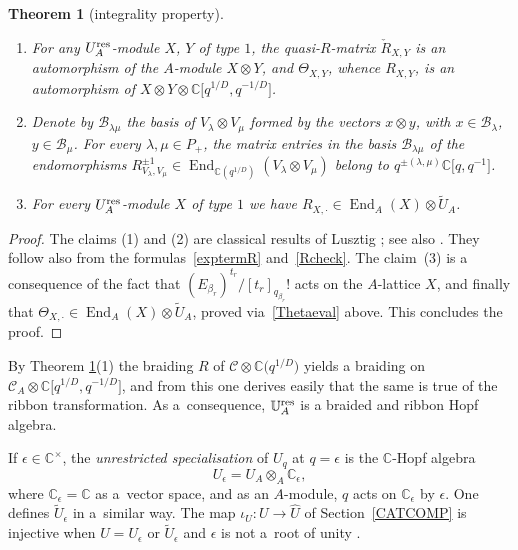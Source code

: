 \documentclass[pdftex]{sigma}%
\numberwithin{equation}{section}
\numberwithin{figure}{section}
\newtheorem{teo}{Theorem}[section]
\newcommand{\e}{\epsilon}
\newcommand{\mc}{\mathbb{C}}
\begin{document}
\begin{teo}[integrality property] \label{integteo}
\quad
\begin{enumerate}\itemsep=0pt
\item[$1.$] For any $U_A^{\rm res}$-module $X$, $Y$ of type $1$, the quasi-$R$-matrix $\check{R}_{X,Y}$ is an automorphism of the $A$-module $X\otimes Y$, and $\Theta_{X,Y}$, whence $R_{X,Y}$, is an automorphism of $X\otimes Y \otimes {\mathbb C}\big[q^{1/D},q^{-1/D}\big]$.

\item[$2.$] Denote by $\mathcal{B}_{\lambda\mu}$ the basis of $V_\lambda\otimes V_\mu$ formed by the vectors $x\otimes y$, with $x\in \mathcal{B}_\lambda$, $y\in \mathcal{B}_\mu$. For every $\lambda,\mu\in P_+$, the matrix entries in the basis $\mathcal{B}_{\lambda\mu}$ of the endomorphisms $R_{V_\lambda,V_\mu}^{\pm 1} \in \operatorname{End}_{\mathbb{C}(q^{1/D})}(V_\lambda \otimes V_\mu)$ belong to $q^{\pm (\lambda,\mu)}\mc\big[q,q^{-1}\big]$.

\item[$3.$] For every $U_A^{\rm res}$-module $X$ of type $1$ we have $R_{X,\cdot} \in \operatorname{End}_A(X) \otimes \tilde{U}_A$.
\end{enumerate}
\end{teo}

\begin{proof} The claims (1) and (2) are classical results of Lusztig \cite[Proposition~24.1.4 and Corollary~24.1.6]{Lusztig}; see also \cite{Le}. They follow also from the formulas~\eqref{exptermR} and~\eqref{Rcheck}. The claim~(3) is a consequence of the fact that $(E_{\beta_r})^{t_r}/[t_r]_{q_{\beta_r}} !$ acts on the $A$-lattice $X$, and finally that $\Theta_{X,\cdot} \in \operatorname{End}_A(X) \otimes \tilde{U}_A$, proved via~\eqref{Thetaeval} above. This concludes the proof.
\end{proof}

By Theorem \ref{integteo}(1) the braiding $R$ of $\mathcal{C}\otimes \mc\big(q^{1/D}\big)$ yields a braiding on ${\mathcal C}_A \otimes {\mathbb C}\big[q^{1/D},q^{-1/D}\big]$, and from this one derives easily that the same is true of the ribbon transformation. As a~consequence, $\mathbb{U}_A^{\rm res}$ is a braided and ribbon Hopf algebra.

If $\epsilon\in {\mathbb C}^\times$, the {\it unrestricted specialisation} of $U_q$ at $q=\epsilon$ is the $\mc$-Hopf algebra
 \begin{equation}\label{restrictU}
 U_\epsilon =U_A\otimes_A {\mathbb C}_{\epsilon},
 \end{equation}
 where ${\mathbb C}_{\epsilon}={\mathbb C}$ as a~vector space, and as an $A$-module, $q$ acts on ${\mathbb C}_{\epsilon}$ by $\epsilon$. One defines $\tilde U_\epsilon$ in a~similar way.
 The map $\iota_U\colon U\to{\hat U}$ of Section~\ref{CATCOMP} is injective when $U=U_\epsilon$ or $\tilde U_\e$
 and $\epsilon$ is not a~root of unity \cite[Proposition~5.11]{Jant}.
\end{document}
